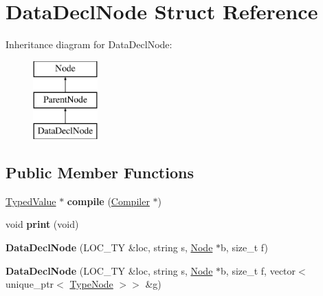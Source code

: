 \hypertarget{structDataDeclNode}{}\section{Data\+Decl\+Node Struct Reference}
\label{structDataDeclNode}
Inheritance diagram for Data\+Decl\+Node\+:\begin{figure}[H]
\begin{center}
\leavevmode
\includegraphics[height=3.000000cm]{structDataDeclNode}
\end{center}
\end{figure}
\subsection*{Public Member Functions}
\begin{DoxyCompactItemize}
\item 
\mbox{\label{structDataDeclNode_a966bd07057d7f14fb65518e93e4d39e6}} 
\hyperlink{structTypedValue}{Typed\+Value} $\ast$ {\bfseries compile} (\hyperlink{structante_1_1Compiler}{Compiler} $\ast$)
\item 
\mbox{\label{structDataDeclNode_a1b85071ccc2c802952a7df389914bf67}} 
void {\bfseries print} (void)
\item 
\mbox{\label{structDataDeclNode_a81fe852b5aaa4bce06e51673daa25023}} 
{\bfseries Data\+Decl\+Node} (L\+O\+C\+\_\+\+TY \&loc, string s, \hyperlink{structNode}{Node} $\ast$b, size\+\_\+t f)
\item 
\mbox{\label{structDataDeclNode_aa559289ca064e4cec8cbabb0e57bd54e}} 
{\bfseries Data\+Decl\+Node} (L\+O\+C\+\_\+\+TY \&loc, string s, \hyperlink{structNode}{Node} $\ast$b, size\+\_\+t f, vector$<$ unique\+\_\+ptr$<$ \hyperlink{structTypeNode}{Type\+Node} $>$$>$ \&g)
\end{DoxyCompactItemize}
